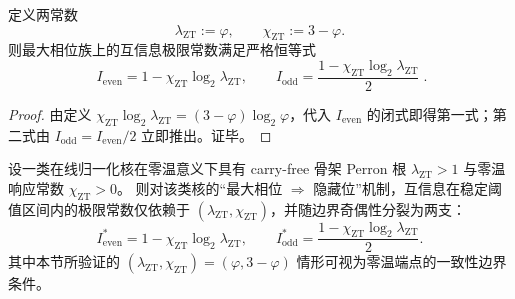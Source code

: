 \begin{theorem}[泄漏常数与零温响应常数的同一化恒等式]\label{thm:pom-leakage-response-identity}
定义两常数
\[
\lambda_{\mathrm{ZT}}:=\varphi,
\qquad
\chi_{\mathrm{ZT}}:=3-\varphi.
\]
则最大相位族上的互信息极限常数满足严格恒等式
\[
\boxed{\;
I_{\mathrm{even}}=1-\chi_{\mathrm{ZT}}\log_2\lambda_{\mathrm{ZT}},
\qquad
I_{\mathrm{odd}}=\frac{1-\chi_{\mathrm{ZT}}\log_2\lambda_{\mathrm{ZT}}}{2}\; }.
\]
\end{theorem}

\begin{proof}
由定义 \( \chi_{\mathrm{ZT}}\log_2\lambda_{\mathrm{ZT}}=(3-\varphi)\log_2\varphi \)，代入 \(I_{\mathrm{even}}\) 的闭式即得第一式；第二式由 \(I_{\mathrm{odd}}=I_{\mathrm{even}}/2\) 立即推出。证毕。
\end{proof}

\begin{conjecture}[泄漏—响应普适律]\label{conj:pom-leakage-response-universality}
设一类在线归一化核在零温意义下具有 carry-free 骨架 Perron 根 \(\lambda_{\mathrm{ZT}}>1\) 与零温响应常数 \(\chi_{\mathrm{ZT}}>0\)。
则对该类核的“最大相位 \(\Rightarrow\) 隐藏位”机制，互信息在稳定阈值区间内的极限常数仅依赖于 \((\lambda_{\mathrm{ZT}},\chi_{\mathrm{ZT}})\)，并随边界奇偶性分裂为两支：
\[
I_{\mathrm{even}}^{\ast}=1-\chi_{\mathrm{ZT}}\log_2\lambda_{\mathrm{ZT}},
\qquad
I_{\mathrm{odd}}^{\ast}=\frac{1-\chi_{\mathrm{ZT}}\log_2\lambda_{\mathrm{ZT}}}{2}.
\]
其中本节所验证的 \((\lambda_{\mathrm{ZT}},\chi_{\mathrm{ZT}})=(\varphi,3-\varphi)\) 情形可视为零温端点的一致性边界条件。
\end{conjecture}

\endinput

